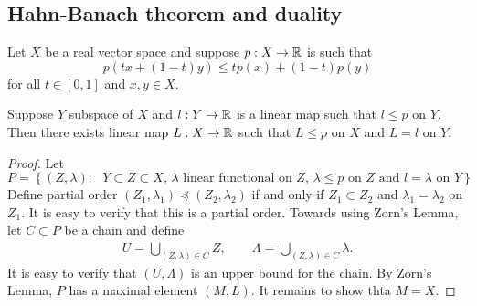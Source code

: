 \documentclass[a4paper]{article}
\begin{document}
\subsection{Hahn-Banach theorem and duality}

\begin{thm}
Let $X$ be a real vector space and suppose $p: X \to \mathbb{R}$ 
is such that 
\[
p(tx + (1-t)y) \leq t p(x) + (1 - t) p (y)
\]
for all $t \in [0,1]$ and $x, y \in X$. 

Suppose $Y$ subspace of $X$ and $l: Y \to \mathbb{R}$ is a linear map 
such that $l \leq p$ on $Y$. Then there exists linear map $L: 
X \to \mathbb{R}$ such that $L \leq p$ on $X$ and $L = l$ on $Y$.
\end{thm}

\begin{proof}
  
Let 
\[
P = \left\{ (Z, \lambda): \text{ 
  $Y \subset Z \subset X$, 
$\lambda$ linear functional on $Z$, $\lambda \leq p$ 
on $Z$ and $l = \lambda$ on $Y$} \right\}
\]
Define partial order $(Z_1, \lambda_1) \preceq (Z_2, \lambda_2)$
if and only if $Z_1 \subset Z_2$ and $\lambda_1 = \lambda_2$
on $Z_1$. It is easy to verify that this is a partial order.
Towards using Zorn's Lemma, let $C \subset P$ be a chain and 
define 
\[
\begin{aligned}
  U = \bigcup_{(Z, \lambda) \in C} Z, \qquad 
  \Lambda = \bigcup_{(Z, \lambda) \in C} \lambda.
\end{aligned}
\]
It is easy to verify that 
$(U, \Lambda)$ is an upper bound for the chain.
By Zorn's Lemma, $P$ has a maximal element $(M, L)$. 
It remains to show thta $M = X$. 


\end{proof}
\end{document}
